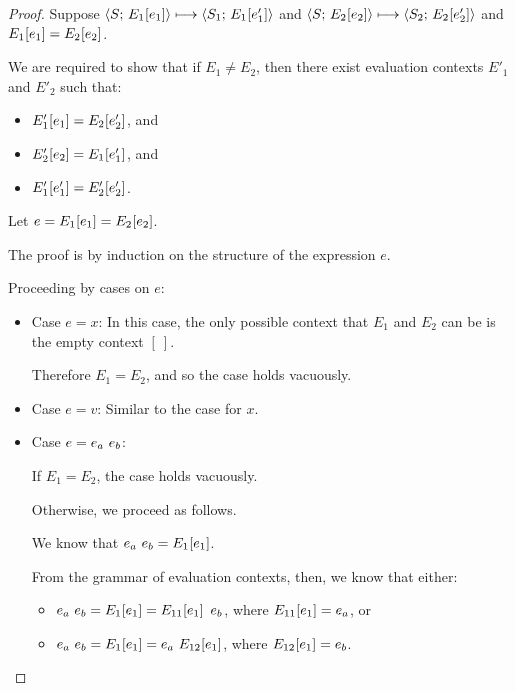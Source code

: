 \begin{proof}
  Suppose $\langle S;\, E_1\hspace{-0.5mm}\left[e_1\right] \rangle \longmapsto
  \langle S_1;\, E_1\hspace{-0.5mm}\left[e'_1\right] \rangle$ and
  $\langle S;\, E_2\hspace{-0.5mm}\left[e_2\right] \rangle \longmapsto
  \langle S_2;\, E_2\hspace{-0.5mm}\left[e'_2\right] \rangle$ and $E_1\hspace{-0.5mm}\left[e_1\right] =
  E_2\hspace{-0.5mm}\left[e_2\right]$.

  We are required to show that if $E_1 \neq E_2$, then there exist
  evaluation contexts $E'_1$ and $E'_2$ such that:
  \begin{itemize}
  \item $E'_1\hspace{-0.5mm}\left[e_1\right] = E_2\hspace{-0.5mm}\left[e'_2\right]$, and
  \item $E'_2\hspace{-0.5mm}\left[e_2\right] = E_1\hspace{-0.5mm}\left[e'_1\right]$, and
  \item $E'_1\hspace{-0.5mm}\left[e'_1\right] = E'_2\hspace{-0.5mm}\left[e'_2\right]$.
  \end{itemize}

  Let $e = E_1\hspace{-0.5mm}\left[e_1\right] = E_2\hspace{-0.5mm}\left[e_2\right]$.

  The proof is by induction on the structure of the expression $e$.

  Proceeding by cases on $e$:

  \begin{itemize}

  \item Case $e = x$: In this case, the only possible context that
    $E_1$ and $E_2$ can be is the empty context $[~]$.

    Therefore $E_1 = E_2$, and so the case holds vacuously.

  \item Case $e = v$: Similar to the case for $x$.

  \item Case $e = e_a~e_b$:

    If $E_1 = E_2$, the case holds vacuously.

    Otherwise, we proceed as follows.

    We know that $e_a~e_b = E_1\hspace{-0.5mm}\left[e_1\right]$.

    From the grammar of evaluation contexts, then, we know that
    either:
    \begin{itemize}
    \item $e_a~e_b = E_1\hspace{-0.5mm}\left[e_1\right] =
      E_{11}\hspace{-0.5mm}\left[e_1\right]~e_b$, where
      $E_{11}\hspace{-0.5mm}\left[e_1\right] = e_a$, or
    \item $e_a~e_b = E_1\hspace{-0.5mm}\left[e_1\right] =
      e_a~E_{12}\hspace{-0.5mm}\left[e_1\right]$, where
      $E_{12}\hspace{-0.5mm}\left[e_1\right] = e_b$.
    \end{itemize}


\end{itemize}
\end{proof}
